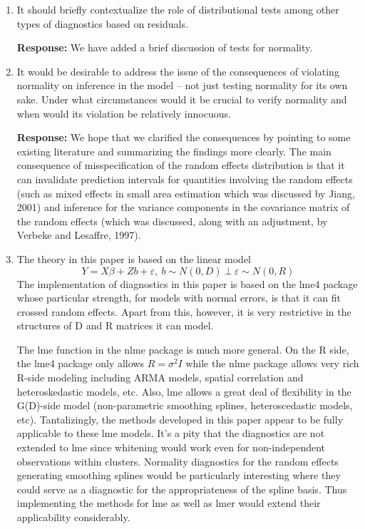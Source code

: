 \documentclass[11pt]{article}
\begin{document}
\begin{enumerate}
\item It should briefly contextualize the role of distributional tests among other types of diagnostics based on residuals.

\textbf{Response:} We have added a brief discussion of tests for normality.

\item It would be desirable to address the issue of the consequences of violating normality on inference in the model -- not just testing normality for its own sake. Under what circumstances would it be crucial to verify normality and when would its violation be relatively innocuous.

\textbf{Response:} We hope that we clarified the consequences by pointing to some existing literature and summarizing the findings more clearly. The main consequence of misspecification of the random effects distribution is that it can invalidate prediction intervals for quantities involving the random effects (such as mixed effects in small area estimation which was discussed by Jiang, 2001) and inference for the variance components in the covariance matrix of the random effects (which was discussed, along with an adjustment, by Verbeke and Lesaffre, 1997).

\item The theory in this paper is based on the linear model 
$$Y = X \beta + Z b + \varepsilon,\ b \sim N(0,D)\  \bot \  \varepsilon \sim N(0,R)$$
The implementation of diagnostics in this paper is based on the lme4 package whose particular strength, for models with normal errors, is that it can fit crossed random effects. Apart from this, however, it is very restrictive in the structures of D and R matrices it can model.

The lme function in the nlme package is much more general. On the R side, the lme4
package only allows $R = \sigma^2 I$ while the nlme package allows very rich R-side modeling including ARMA models, spatial correlation and heteroskedastic models, etc. Also, lme allows a great deal of flexibility in the G(D)-side model (non-parametric smoothing splines, heteroscedastic models, etc). Tantalizingly, the methods developed in this paper appear to be fully applicable to these lme models. It's a pity that the diagnostics are not extended to lme since whitening would work even for non-independent observations within clusters. Normality diagnostics for the random effects generating smoothing splines would be particularly interesting where they could serve as a diagnostic for the appropriateness of the spline basis. Thus implementing the methods for lme as well as lmer would extend their applicability considerably.


\end{enumerate}
\end{document}
